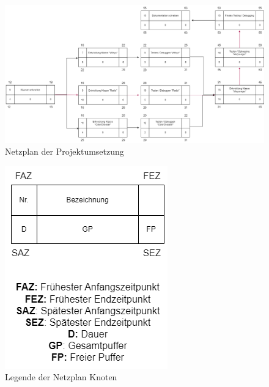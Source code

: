 \documentclass[a4paper, 11pt]{scrartcl}
\begin{document}
\begin{small}
\begin{figure}[H]
    \begin{center}
        \includegraphics[scale=0.35]{Bilder/netzplan_umsetzung.png}
        \caption{Netzplan der Projektumsetzung}\label{diag:netzplan_umsetzung}
    \end{center}
\end{figure}

\begin{figure}[H]
    \begin{center}
        \includegraphics[scale=0.7]{Bilder/netzplan_legende.png}
        \caption{Legende der Netzplan Knoten}\label{diag:netzplan_legende}
    \end{center}
\end{figure}


\end{small}
\end{document}
